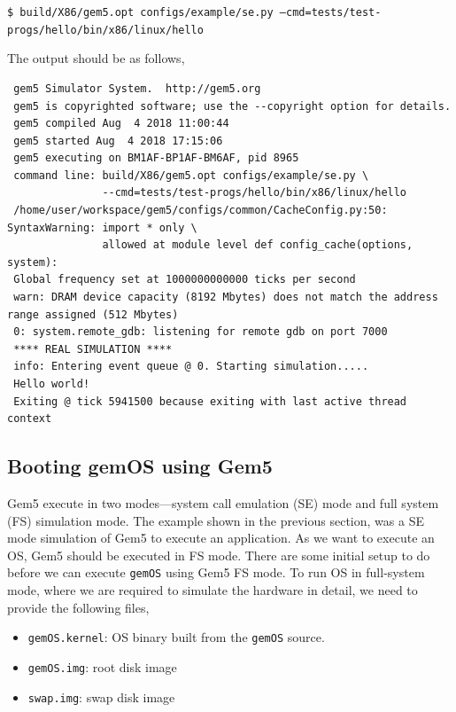 \documentclass[12pt]{article}
\begin{document}
{\vspace{0.25cm}
\noindent
\texttt{\$ \small{build/X86/gem5.opt configs/example/se.py --cmd=tests/test-progs/hello/bin/x86/linux/hello}}

\vspace{0.25cm}
\noindent
The output should be as follows,
\begin{footnotesize}
\begin{verbatim}
 gem5 Simulator System.  http://gem5.org
 gem5 is copyrighted software; use the --copyright option for details.
 gem5 compiled Aug  4 2018 11:00:44
 gem5 started Aug  4 2018 17:15:06
 gem5 executing on BM1AF-BP1AF-BM6AF, pid 8965
 command line: build/X86/gem5.opt configs/example/se.py \
               --cmd=tests/test-progs/hello/bin/x86/linux/hello
 /home/user/workspace/gem5/configs/common/CacheConfig.py:50: SyntaxWarning: import * only \ 
               allowed at module level def config_cache(options, system):
 Global frequency set at 1000000000000 ticks per second
 warn: DRAM device capacity (8192 Mbytes) does not match the address range assigned (512 Mbytes)
 0: system.remote_gdb: listening for remote gdb on port 7000
 **** REAL SIMULATION ****
 info: Entering event queue @ 0. Starting simulation.....
 Hello world!
 Exiting @ tick 5941500 because exiting with last active thread context 
\end{verbatim}
\end{footnotesize}

\subsection{Booting gemOS using Gem5} 
Gem5 execute in two modes---system call emulation (SE) mode and full system (FS) simulation mode.
%
The example shown in the previous section, was a SE mode simulation of Gem5 to execute an application.
%
As we want to execute an OS, Gem5 should be executed in FS mode. 
%
There are some initial setup to do before we can execute \texttt{gemOS} using Gem5 FS mode.
%
To run OS in full-system mode, where we are required to simulate the hardware in detail, 
we need to provide the following files,
\begin{itemize}
    \item \texttt{gemOS.kernel}: OS binary built from the \texttt{gemOS} source. 
    \item \texttt{gemOS.img}: root disk image
    \item \texttt{swap.img}: swap disk image
\end{itemize}

}
\end{document}

